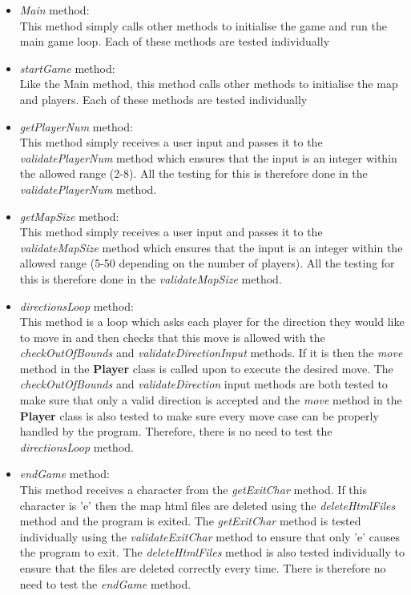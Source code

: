 \documentclass[a4paper,12pt]{extarticle}
\begin{document}
\begin{itemize}

     \item \textit{Main} method:\\
     This method simply calls other methods to initialise the game and run the main game loop. Each of 	  	 these methods are tested individually
     
     \item \textit{startGame} method:\\
     Like the Main method, this method calls other methods to initialise the map and players. Each of    	 these methods are tested individually
     
     \item \textit{getPlayerNum} method:\\
     This method simply receives a user input and passes it to the \textit{validatePlayerNum} method 	     	 which ensures that the input is an integer within the allowed range (2-8). All the testing for  	 	 this is therefore done in the \textit{validatePlayerNum} method.
     
     \item \textit{getMapSize} method:\\
     This method simply receives a user input and passes it to the \textit{validateMapSize} method 	      	 which ensures that the input is an integer within the allowed range (5-50 depending on the number  	     of players). All the testing for this is therefore done in the \textit{validateMapSize} method.
     
     \item \textit{directionsLoop} method:\\
     This method is a loop which asks each player for the direction they would like to move in and   	 	 then checks that this move is allowed with the \textit{checkOutOfBounds} and  	  	 					     \textit{validateDirectionInput} methods. If it is then the \textit{move} method in the 	 	  	 	 \textbf{Player} class is called upon to execute the desired move. The \textit{checkOutOfBounds}              	 and \textit{validateDirection} input methods are both tested to make sure that only a valid 	 	 	 direction is accepted and the \textit{move} method in the \textbf{Player} class is also tested to 	    	 make sure every move case can be properly handled by the program. Therefore, there is no need to 		     test the \textit{directionsLoop} method.
     
     \item \textit{endGame} method:\\
     This method receives a character from the \textit{getExitChar} method. If this character is 'e' 		     then the map html files are deleted using the \textit{deleteHtmlFiles} method and the program is 		     exited. The \textit{getExitChar} method is tested individually using the 			 	 				 	 \textit{validateExitChar} method to ensure that only 'e' causes the program to exit. The 				 	 \textit{deleteHtmlFiles} method is also tested individually to ensure that the files are deleted 		 	 correctly every time. There is therefore no need to test the \textit{endGame} method.
     

\end{itemize}
\end{document}
